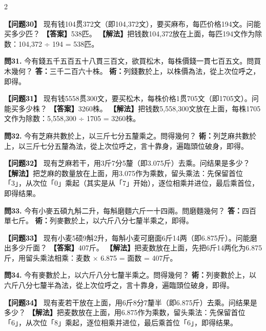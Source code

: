 \documentclass[11pt,a4paper]{article}
\begin{document}
\begin{paracol}{2}
\switchcolumn

\textbf{【问题30】} 现有钱104贯372文（即104,372文），要买麻布，每匹价格194文。问能买多少匹？\break
\textbf{【答案】}538匹。\break
\textbf{【解法】}把钱数104,372放在上面，每匹194文作为除数：104,372 ÷ 194 = 538匹。

\switchcolumn*

\textbf{問31.} 今有錢五千五百五十八貫三百文，欲買松木，每株價錢一貫七百五文。問買木幾何？\break
\textbf{答：}三千二百六十株。\break
\textbf{術：}列錢數於上，以株價為法，從上次位呼之，即得。

\switchcolumn

\textbf{【问题31】} 现有钱5558贯300文，要买松木，每株价格1贯705文（即1705文）。问能买多少株？\break
\textbf{【答案】}3260株。\break
\textbf{【解法】}把钱数5,558,300文放在上面，每株1705文作为除数：5,558,300 ÷ 1705 = 3260株。

\switchcolumn*

\textbf{問32.} 今有芝麻共數於上，以三斤七分五釐乘之。問得幾何？\break
\textbf{術：}列芝麻共數於上，以三斤七分五釐為法，從上次位呼之，言十靠身，遍臨頭位破身，即得。

\switchcolumn

\textbf{【问题32】} 现有芝麻若干，用3斤7分5釐（即3.075斤）去乘。问结果是多少？\break
\textbf{【解法】}把芝麻的数量放在上面，用3.075作为乘数，留头乘法：先保留首位「3」，从次位「0」乘起（其实是从「7」开始），逐位相乘并进位，最后乘首位，即得结果。

\switchcolumn*

\textbf{問33.} 今有小麥五碩九斛二升，每斛磨麵六斤一十四兩。問磨麵幾何？\break
\textbf{答：}四百單七斤。\break
\textbf{術：}列麥數於上，以六斤八分七釐半乘之，即得。

\switchcolumn

\textbf{【问题33】} 现有小麦5硕9斛2升，每斛小麦可磨面6斤14两（即6.875斤）。问能磨出多少斤面？\break
\textbf{【答案】}407斤。\break
\textbf{【解法】}把麦数放在上面，先把6斤14两化为6.875斤，用留头乘法相乘：麦数 × 6.875 = 面数 = 407斤。

\switchcolumn*

\textbf{問34.} 今有麥數於上，以六斤八分七釐半乘之。問得幾何？\break
\textbf{術：}列麥數於上，以六斤八分七釐半為法，從上次位呼之，言十靠身，遍臨頭位破身，即得。

\switchcolumn

\textbf{【问题34】} 现有麦若干放在上面，用6斤8分7釐半（即6.875斤）去乘。问结果是多少？\break
\textbf{【解法】}把麦数放在上面，用6.875作为乘数，留头乘法：先保留首位「6」，从次位「8」乘起，逐位相乘并进位，最后乘首位「6」，即得结果。


\end{paracol}
\end{document}
